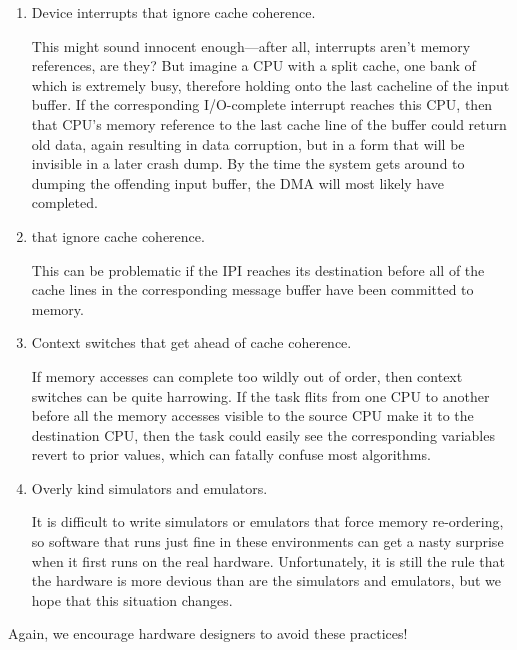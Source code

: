 \begin{enumerate}
\item	Device interrupts that ignore cache coherence.

	This might sound innocent enough---after all, interrupts
	aren't memory references, are they?
	But imagine a CPU with a split cache, one bank of which is
	extremely busy, therefore holding onto the last cacheline
	of the input buffer.
	If the corresponding I/O-complete interrupt reaches this
	CPU, then that CPU's memory reference to the last cache
	line of the buffer could return old data, again resulting
	in data corruption, but in a form that will be invisible
	in a later crash dump.
	By the time the system gets around to dumping the offending
	input buffer, the DMA will most likely have completed.

\item	{} that ignore cache coherence.

	This can be problematic if the IPI reaches its destination
	before all of the cache lines in the corresponding message
	buffer have been committed to memory.

\item	Context switches that get ahead of cache coherence.

	If memory accesses can complete too wildly out of order,
	then context switches can be quite harrowing.
	If the task flits from one CPU to another before all the
	memory accesses visible to the source CPU make it to the
	destination CPU, then the task could easily see the corresponding
	variables revert to prior values, which can fatally confuse
	most algorithms.

\item	Overly kind simulators and emulators.

	It is difficult to write simulators or emulators that force
	memory re-ordering, so software that runs just fine in
	these environments can get a nasty surprise when it first
	runs on the real hardware.
	Unfortunately, it is still the rule that the hardware is more
	devious than are the simulators and emulators, but we hope that
	this situation changes.
\end{enumerate}

Again, we encourage hardware designers to avoid these practices!

